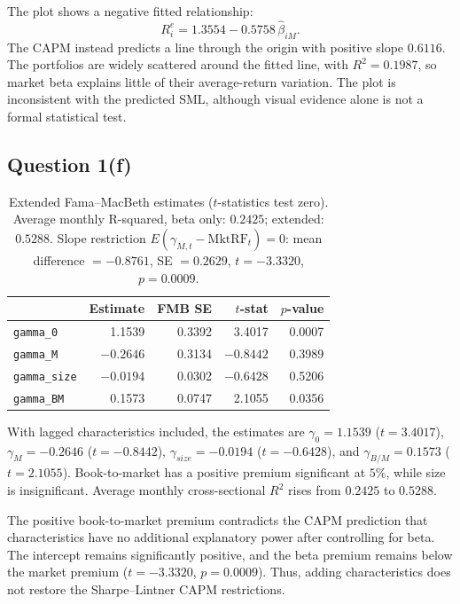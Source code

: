 The plot shows a negative fitted relationship:
\[
R^e_i = 1.3554 - 0.5758\,\hat\beta_{iM}.
\]
The CAPM instead predicts a line through the origin with positive slope
$0.6116$. The portfolios are widely scattered around the fitted line, with
$R^2 = 0.1987$, so market beta explains little of their average-return
variation. The plot is inconsistent with the predicted SML, although visual
evidence alone is not a formal statistical test.

\subsection{Question 1(f)}

\begin{table}[H]
\centering
\caption{Extended Fama--MacBeth estimates ($t$-statistics test zero). Average
monthly R-squared, beta only: $0.2425$; extended: $0.5288$. Slope restriction
$E(\gamma_{M,t} - \mathrm{MktRF}_t) = 0$: mean difference $= -0.8761$,
SE $= 0.2629$, $t = -3.3320$, $p = 0.0009$.}
\small
\begin{tabular}{lrrrr}
\toprule
& Estimate & FMB SE & $t$-stat & $p$-value \\
\midrule
\texttt{gamma\_0}    & 1.1539 & 0.3392 & 3.4017 & 0.0007 \\
\texttt{gamma\_M}    & $-0.2646$ & 0.3134 & $-0.8442$ & 0.3989 \\
\texttt{gamma\_size} & $-0.0194$ & 0.0302 & $-0.6428$ & 0.5206 \\
\texttt{gamma\_BM}   & 0.1573 & 0.0747 & 2.1055 & 0.0356 \\
\bottomrule
\end{tabular}
\label{tab:p2f}
\end{table}

With lagged characteristics included, the estimates are $\gamma_0 = 1.1539$
($t = 3.4017$), $\gamma_M = -0.2646$ ($t = -0.8442$),
$\gamma_{size} = -0.0194$ ($t = -0.6428$), and $\gamma_{B/M} = 0.1573$
($t = 2.1055$). Book-to-market has a positive premium significant at $5\%$,
while size is insignificant. Average monthly cross-sectional $R^2$ rises from
$0.2425$ to $0.5288$.

The positive book-to-market premium contradicts the CAPM prediction that
characteristics have no additional explanatory power after controlling for
beta. The intercept remains significantly positive, and the beta premium
remains below the market premium ($t = -3.3320$, $p = 0.0009$). Thus, adding
characteristics does not restore the Sharpe--Lintner CAPM restrictions.


